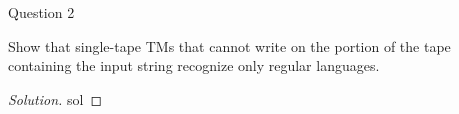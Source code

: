 \begin{solution}{Question 2}\label{ques:2}
    \begin{question}
        Show that single-tape TMs that cannot write on the portion of the tape containing the input string recognize only regular languages.
    \end{question}
    \tcblower{}
    \begin{proof}[Solution]
        sol
    \end{proof}
\end{solution}
